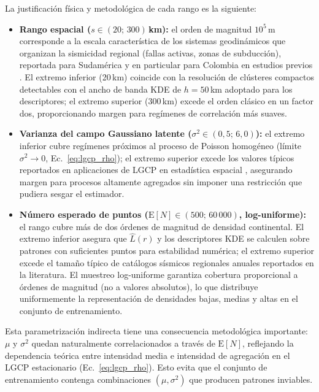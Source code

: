 \documentclass[a4paper,fleqn]{cas-sc}
\numberwithin{equation}{section}
\begin{document}
La justificaci\'on f\'isica y metodol\'ogica de cada rango es la
siguiente:
\begin{itemize}
    \item \textbf{Rango espacial ($s \in (20;\, 300)$\,km):} el orden
    de magnitud $10^5$\,m corresponde a la escala caracter\'istica de
    los sistemas geodin\'amicos que organizan la sismicidad regional
    (fallas activas, zonas de subducci\'on), reportada para
    Sudam\'erica y en particular para Colombia en estudios previos
    \citep{TesisColegas}. El extremo inferior (20\,km) coincide con la
    resoluci\'on de cl\'usteres compactos detectables con el ancho de
    banda KDE de $h=50$\,km adoptado para los descriptores; el extremo
    superior (300\,km) excede el orden cl\'asico en un factor dos,
    proporcionando margen para reg\'imenes de correlaci\'on m\'as
    suaves.

    \item \textbf{Varianza del campo Gaussiano latente
    ($\sigma^2 \in (0{,}5;\, 6{,}0)$):} el extremo inferior cubre
    reg\'imenes pr\'oximos al proceso de Poisson homog\'eneo (l\'imite
    $\sigma^2 \to 0$, Ec.~\ref{eq:lgcp_rho}); el extremo superior
    excede los valores t\'ipicos reportados en aplicaciones de LGCP en
    estad\'istica espacial \citep{Moller1998,MollerWaagepetersen2004},
    asegurando margen para procesos altamente agregados sin imponer
    una restricci\'on que pudiera sesgar el estimador.

    \item \textbf{N\'umero esperado de puntos
    ($\mathrm{E}[N] \in (500;\, 60\,000)$, log-uniforme):} el rango
    cubre m\'as de dos \'ordenes de magnitud de densidad continental.
    El extremo inferior asegura que $\hat{L}(r)$ y los descriptores
    KDE se calculen sobre patrones con suficientes puntos para
    estabilidad num\'erica; el extremo superior excede el tama\~no
    t\'ipico de cat\'alogos s\'ismicos regionales anuales reportados
    en la literatura. El muestreo log-uniforme garantiza cobertura
    proporcional a \'ordenes de magnitud (no a valores absolutos), lo
    que distribuye uniformemente la representaci\'on de densidades
    bajas, medias y altas en el conjunto de entrenamiento.
\end{itemize}

Esta parametrizaci\'on indirecta tiene una consecuencia metodol\'ogica
importante: $\mu$ y $\sigma^2$ quedan naturalmente correlacionados a
trav\'es de $\mathrm{E}[N]$, reflejando la dependencia te\'orica entre
intensidad media e intensidad de agregaci\'on en el LGCP estacionario
(Ec.~\ref{eq:lgcp_rho}). Esto evita que el conjunto de entrenamiento
contenga combinaciones $(\mu,\sigma^2)$ que producen patrones inviables.
\end{document}
